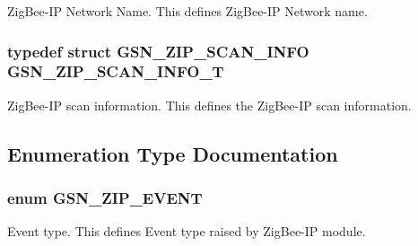 ZigBee-\/IP Network Name. This defines ZigBee-\/IP Network name. 

\hypertarget{a00618_adc2498c7409e8d5e710cfc014e9b84cf}{
\subsubsection[{GSN\_\-ZIP\_\-SCAN\_\-INFO\_\-T}]{\setlength{\rightskip}{0pt plus 5cm}typedef struct {\bf GSN\_\-ZIP\_\-SCAN\_\-INFO} {\bf GSN\_\-ZIP\_\-SCAN\_\-INFO\_\-T}}}
\label{a00618_adc2498c7409e8d5e710cfc014e9b84cf}


ZigBee-\/IP scan information. This defines the ZigBee-\/IP scan information. 



\subsection{Enumeration Type Documentation}
\hypertarget{a00618_a6118b093f8c8dfb5596d2971c5c2c698}{
\subsubsection[{GSN\_\-ZIP\_\-EVENT}]{\setlength{\rightskip}{0pt plus 5cm}enum {\bf GSN\_\-ZIP\_\-EVENT}}}
\label{a00618_a6118b093f8c8dfb5596d2971c5c2c698}


Event type. This defines Event type raised by ZigBee-\/IP module. 

